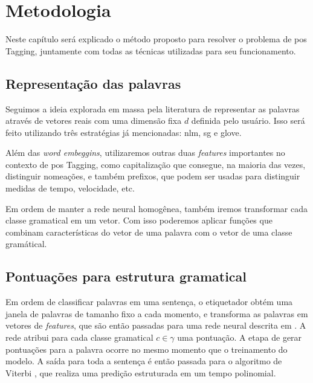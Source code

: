 \chapter{Metodologia}\label{desenvolvimento}

Neste capítulo será explicado o método proposto para resolver o problema de \ac{pos} Tagging, juntamente com todas as técnicas utilizadas para seu funcionamento.

\section{Representação das palavras}

Seguimos a ideia explorada em massa pela literatura de representar as palavras através de vetores reais com uma dimensão fixa $d$ definida pelo usuário. Isso será feito utilizando três estratégias já mencionadas: \ac{nlm}, \ac{sg} e \ac{glove}.

Além das \textit{word embeggins}, utilizaremos outras duas \textit{features} importantes no contexto de \ac{pos} Tagging, como capitalização que consegue, na maioria das vezes, distinguir nomeações, e também prefixos, que podem ser usadas para distinguir medidas de tempo, velocidade, etc. 

Em ordem de manter a rede neural homogênea, também iremos transformar cada classe gramatical em um vetor. Com isso poderemos aplicar funções que combinam características do vetor de uma palavra com o vetor de uma classe gramátical.


\section{Pontuações para estrutura gramatical}

Em ordem de classificar palavras em uma sentença, o etiquetador obtém uma janela de palavras de tamanho fixo a cada momento, e transforma as palavras em vetores de \textit{features}, que são então passadas para uma rede neural descrita em \cite{collobert2008unified}. A rede atribui para cada classe gramatical $c \in \gamma$ uma pontuação. A etapa de gerar pontuações para a palavra ocorre no mesmo momento que o treinamento do modelo. A saída para toda a sentença é então passada para o algoritmo de Viterbi \cite{viterbi1967error}, que realiza uma predição estruturada em um tempo polinomial.

